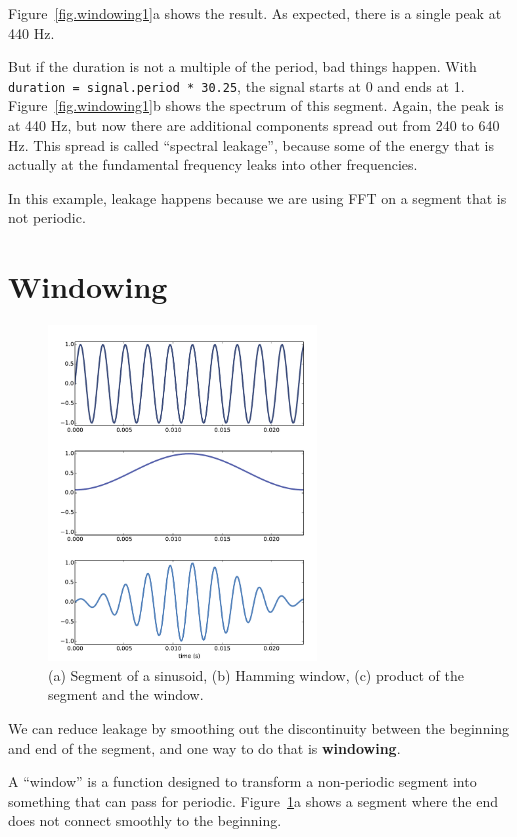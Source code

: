 \documentclass[12pt]{book}
\begin{document}
Figure~\ref{fig.windowing1}a shows the result.  As expected, there is
a single peak at 440 Hz.

But if the duration is not a multiple of the period, bad things
happen.  With {\tt duration = signal.period * 30.25}, the signal
starts at 0 and ends at 1.  Figure~\ref{fig.windowing1}b shows the
spectrum of this segment.  Again, the peak is at 440 Hz, but now there
are additional components spread out from 240 to 640 Hz.  This spread
is called ``spectral leakage'', because some of the energy that is
actually at the fundamental frequency leaks into other frequencies.

In this example, leakage happens because we are using FFT on a segment
that is not periodic.


\section{Windowing}

\begin{figure}
\centerline{\includegraphics[height=3.5in]{figs/windowing2.pdf}}
\caption{(a) Segment of a sinusoid, (b) Hamming window, (c) product
of the segment and the window.}
\label{fig.windowing2}
\end{figure}

We can reduce leakage by smoothing out the discontinuity between
the beginning and end of the segment, and one way to do that is
{\bf windowing}.

A ``window'' is a function designed to transform a non-periodic
segment into something that can pass for periodic.
Figure~\ref{fig.windowing2}a shows a segment where the end does not
connect smoothly to the beginning.
\end{document}
